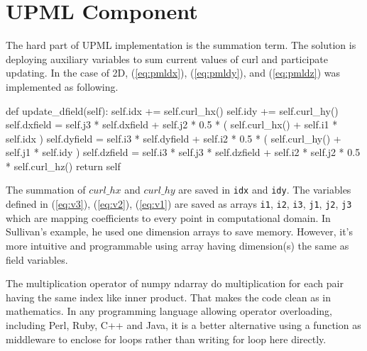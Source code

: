 \section{UPML Component}
The hard part of UPML implementation is the summation term. The solution is deploying auxiliary variables to sum current
values of curl and participate updating. In the case of 2D, (\ref{eq:pmldx}), (\ref{eq:pmldy}), and (\ref{eq:pmldz})
was implemented as following.
\begin{code}
    def update_dfield(self):
        self.idx += self.curl_hx()
        self.idy += self.curl_hy()
        self.dxfield = self.j3 * self.dxfield 
                     + self.j2 * 0.5 * ( self.curl_hx() + self.i1 * self.idx )
        self.dyfield = self.i3 * self.dyfield 
                     + self.i2 * 0.5 * ( self.curl_hy() + self.j1 * self.idy )
        self.dzfield = self.i3 * self.j3 * self.dzfield 
                     + self.i2 * self.j2 * 0.5 * self.curl_hz()
        return self
\end{code}
The summation of $curl\_hx$ and $curl\_hy$ are saved in \texttt{idx} and \texttt{idy}. The variables defined in
(\ref{eq:v3}), (\ref{eq:v2}), (\ref{eq:v1}) are saved as arrays \texttt{i1}, \texttt{i2}, \texttt{i3}, \texttt{j1},
\texttt{j2}, \texttt{j3} which are mapping coefficients to every point in computational domain. In Sullivan's example,
he used one dimension arrays to save memory. However, it's more intuitive and programmable using array having
dimension(s) the same as field variables.

The multiplication operator of numpy ndarray do multiplication for each pair having the same index like inner
product. That makes the code clean as in mathematics. In any programming language allowing operator overloading,
including Perl, Ruby, C++ and Java, it is a better alternative using a function as middleware to enclose for loops
rather than writing for loop here directly.
